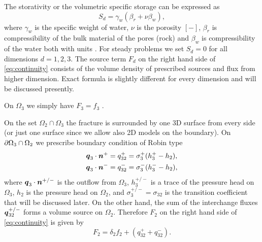 The storativity 
 or the volumetric specific storage  can be expressed as
\begin{equation}
  S_d = \gamma_w(\beta_r + \nu \beta_w),
\end{equation}
where $\gamma_w$  is the specific weight of water, $\nu$ is the porosity $[-]$, $\beta_r$ is compressibility of the bulk material of the pores (rock)
and $\beta_w$ is compressibility of the water both with units . For steady problems we set $S_d=0$ for all dimensions $d=1,2,3$.
The source term $F_d$  on the right hand side of \eqref{eq:continuity} consists of the volume density of prescribed sources 
  and flux from higher dimension. 
Exact formula is slightly different for every dimension and will be discussed presently.

On $\Omega_3$ we simply have $F_3  = f_3$ .

On the set $\Omega_2 \cap \Omega_3$ the fracture is surrounded by one 3D surface from every side (or just one surface since we allow also 2D models on the boundary).
On $\partial\Omega_3 \cap \Omega_2$ we prescribe boundary condition of Robin type
\begin{align*}
        \mathbf{\boldsymbol{q}}_3\cdot \mathbf{\boldsymbol{n}}^{+} &= q_{32}^{+} =\sigma_{3}^{+} (h_3^{+}-h_2),\\
        \mathbf{\boldsymbol{q}}_3\cdot \mathbf{\boldsymbol{n}}^{-} &= q_{32}^{-} =\sigma_{3}^{-} (h_3^{-}-h_2),
\end{align*}
where $\mathbf{\boldsymbol{q}}_3\cdot\mathbf{\boldsymbol{n}}^{+/-}$  is the outflow from $\Omega_3$, $h_3^{+/-}$ is
a trace of the pressure head on $\Omega_3$, $h_2$ is the pressure head on $\Omega_2$, and 
$\sigma_{3}^{+/-}=\sigma_{32}$  is the transition coefficient that will be discussed later. 
On the other hand, the sum of the interchange fluxes $\mathbf{\boldsymbol{q}}_{32}^{+/-}$ forms
a volume source on $\Omega_2$.  Therefore $F_2$  on the right hand side of \eqref{eq:continuity} is
given by
\begin{equation}
   \label{source_2D}
   F_2 = \delta_2 f_2 + (q_{32}^{+} + q_{32}^{-}).
\end{equation}

